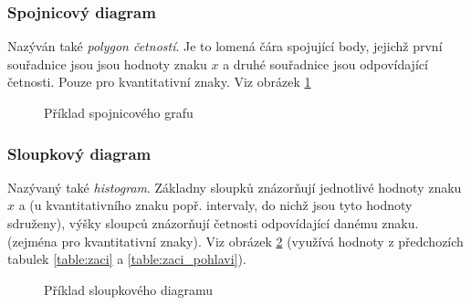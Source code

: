 \documentclass[12pt]{article}
\begin{document}
\subsubsection{Spojnicový diagram}
Nazýván také \emph{polygon četností}. Je to lomená čára spojující body, jejichž první souřadnice jsou jsou hodnoty znaku $x$ a druhé souřadnice jsou odpovídající četnosti. Pouze pro kvantitativní znaky. Viz obrázek \ref{fig:spojnicovy_graf}
\begin{figure}[H]
\centering
{}
\caption{Příklad spojnicového grafu}
\label{fig:spojnicovy_graf}
\end{figure}

\subsubsection{Sloupkový diagram}
Nazývaný také \emph{histogram}. Základny sloupků znázorňují jednotlivé hodnoty znaku $x$ a (u kvantitativního znaku popř. intervaly, do nichž jsou tyto hodnoty sdruženy), výšky sloupců znázorňují četnosti odpovídající danému znaku. (zejména pro kvantitativní znaky). Viz obrázek \ref{fig:sloupkovy_graf} (využívá hodnoty z předchozích tabulek \ref{table:zaci} a \ref{table:zaci_pohlavi}).
\begin{figure}[h!]
\centering
{}

\caption{Příklad sloupkového diagramu}
\label{fig:sloupkovy_graf}
\end{figure}
\end{document}
